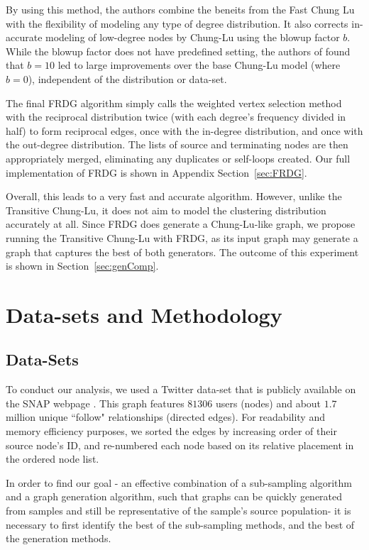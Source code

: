 \documentclass[pdftex,11pt,a4paper,twocolumn]{scrartcl}
\begin{document}
By using this method, the authors combine the beneits from the Fast Chung Lu with the flexibility of modeling any type of degree distribution. It also corrects in-accurate modeling of low-degree nodes by Chung-Lu using the blowup factor $b$. While the blowup factor does not have predefined setting, the authors of \cite{FRDG} found that $b=10$ led to large improvements over the base Chung-Lu model (where $b=0$), independent of the distribution or data-set. 

The final FRDG algorithm simply calls the weighted vertex selection method with the reciprocal distribution twice (with each degree's frequency divided in half) to form reciprocal edges, once with the in-degree distribution, and once with the out-degree distribution. The lists of source and terminating nodes are then appropriately merged, eliminating any duplicates or self-loops created. Our full implementation of FRDG is shown in Appendix Section~\ref{sec:FRDG}.

Overall, this leads to a very fast and accurate algorithm. However, unlike the Transitive Chung-Lu, it does not aim to model the clustering distribution accurately at all. Since FRDG does generate a Chung-Lu-like graph, we propose running the Transitive Chung-Lu with FRDG, as its input graph may generate a graph that captures the best of both generators. The outcome of this experiment is shown in Section~\ref{sec:genComp}. 


\section{Data-sets and Methodology}

\subsection{Data-Sets}

To conduct our analysis, we used a Twitter data-set that is publicly available on the SNAP webpage \cite{snap}. This graph features $81306$ users (nodes) and about $1.7$ million unique ``follow" relationships (directed edges). For readability and memory efficiency purposes, we sorted the edges by increasing order of their source node's ID, and re-numbered each node based on its relative placement in the ordered node list. 

In order to find our goal - an effective combination of a sub-sampling algorithm and a graph generation algorithm, such that graphs can be quickly generated from samples and still be representative of the sample's source population- it is necessary to first identify the best of the sub-sampling methods, and the best of the generation methods.
\end{document}
